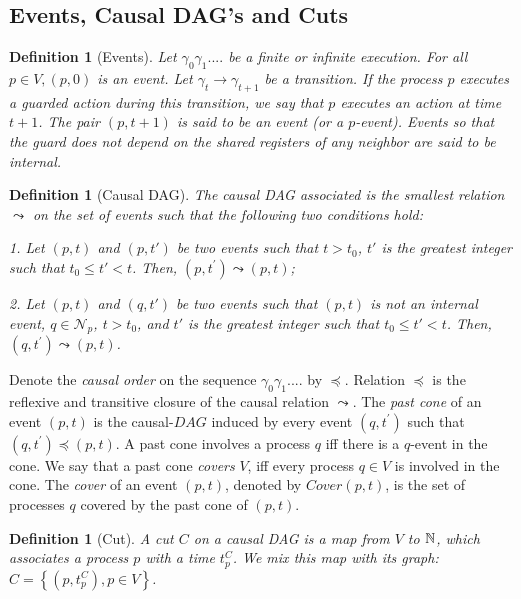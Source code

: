 \documentclass[11pt]{article}
\newtheorem{definition}[theorem]{Definition}
\newcommand{\BEGLIST}{\begin{list}{}{\partopsep -2pt \parsep -2pt \listparindent 0pt}}\newcommand{\ENDLIST}{\end{list}}
\newcommand{\mN}   {\mathcal{N}}
\begin{document}
\subsection{Events, Causal DAG's and Cuts}

\begin{definition}[Events] 
Let $\gamma _0\gamma _1....$ be a finite or
infinite execution. 
 For all $ p\in V,\left( p,0\right) $ is an event.
  Let $\gamma _{t}\rightarrow \gamma _{t+1}$ be a transition. If the
process $p$ executes a guarded action during this transition, we say that $p$
executes an action at time $t+1$.  The pair $\left( p,t+1\right)$ is said to be an
event (or a $p$-event). 
Events so that the guard does not depend on the shared registers of any neighbor are said to be \emph{internal}.
\end{definition}

\begin{definition}[Causal DAG]
The causal DAG associated is the smallest relation $\leadsto $ on the set of events
such that the following two conditions hold:
\BEGLIST
\item [1.] Let $( p,t)$ and $(p,t')$ be two events such that $t>t_0$, $t'$ is 
the greatest integer such that $t_0 \leq t' < t$. Then,
$\left( p,t^{\prime }\right) \leadsto \left( p,t\right)$;

\item [2.] 
Let $(p,t)$ and $(q,t')$ be two events such that $(p,t)$ is not an internal event, $q \in \mN_p$, $t>t_0$, and $t'$ is 
the greatest integer such that $t_0 \leq t' < t$.  Then, 
$\left( q,t^{\prime }\right) \leadsto \left( p,t\right) $.
\ENDLIST
\end{definition}

Denote the \emph{causal order} on the sequence $\gamma _0\gamma _1....$ by $\preceq$.  Relation $\preceq$ is 
the reflexive and transitive closure of the causal
relation $\leadsto $.
The \emph{past cone} of an event $\left( p,t\right) $ is the  causal-$DAG$ induced
by every event $\left( q,t^{\prime }\right) $ such that $\left( q,t^{\prime
}\right) \preceq \left( p,t\right) $. 
A past cone involves a process $q$ iff there is a $q$-event in the cone.  We say that a past 
cone \emph{covers} $V$, iff every process $q\in V$ is involved in the cone. The \emph{cover} of an 
event $(p,t)$, denoted by $Cover(p,t)$, is the set of processes $q$ covered by the past cone of $(p,t)$. 




\begin{definition}[Cut]
A cut $C$ on a causal DAG is a map from $V$ to $\Bbb{N}$, which associates
a process $p$ with a time $t_{p}^{C}$. We mix this map with its graph: $C=
\left\{ \left( p,t_{p}^{C}\right) ,p\in V\right\} $.\end{definition}
\end{document}
